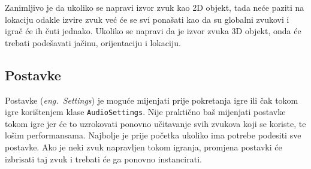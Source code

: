 Zanimljivo je da ukoliko se napravi izvor zvuk kao 2D objekt, tada neće paziti na lokaciju odakle izvire zvuk već će se svi ponašati kao da su globalni zvukovi i igrač će ih čuti jednako. Ukoliko se napravi da je izvor zvuka 3D objekt, onda će trebati podešavati jačinu, orijentaciju i lokaciju.

\subsection{Postavke}
Postavke (\emph{eng.~Settings}) je moguće mijenjati prije pokretanja igre ili čak tokom igre korištenjem klase \texttt{AudioSettings}. Nije praktično baš mijenjati postavke tokom igre jer će to uzrokovati ponovno učitavanje svih zvukova koji se koriste, te lošim performansama. Najbolje je prije početka ukoliko ima potrebe podesiti sve postavke. Ako je neki zvuk napravljen tokom igranja, promjena postavki će izbrisati taj zvuk i trebati će ga ponovno instancirati.